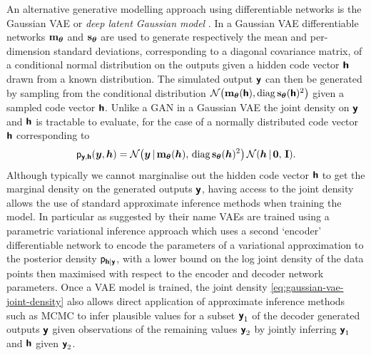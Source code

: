 
An alternative generative modelling approach using differentiable networks is the Gaussian \ac{VAE}  or \emph{deep latent Gaussian model} \citep{rezende2014stochastic}. In a Gaussian \ac{VAE} differentiable networks ${\mathbf{m}}_{\boldsymbol{\theta}}$ and ${\mathbf{s}}_{\boldsymbol{\theta}}$ are used to generate respectively the mean and per-dimension standard deviations, corresponding to a diagonal covariance matrix, of a conditional normal distribution on the outputs given a hidden code vector $\boldsymbol{\mathsf{h}}$ drawn from a known distribution. The simulated output $\boldsymbol{\mathsf{y}}$ can then be generated by sampling from the conditional distribution $\nrm{\vctfunc{m}_{\vct{\theta}}(\rvct{h}), \diag\vctfunc{s}_{\vct{\theta}}(\rvct{h})^2}$ given a sampled code vector $\boldsymbol{\mathsf{h}}$. Unlike a \ac{GAN} in a Gaussian \ac{VAE} the joint density on $\boldsymbol{\mathsf{y}}$ and $\boldsymbol{\mathsf{h}}$ is tractable to evaluate, for the case of a normally distributed code vector $\boldsymbol{\mathsf{h}}$ corresponding to
\begin{equation}\label{eq:gaussian-vae-joint-density}
  \pden{\rvct{y},\rvct{h}}(\vct{y},\vct{h}) = 
  \nrm{\vct{y} \gvn \vctfunc{m}_{\vct{\theta}}(\vct{h}),\, \diag\vctfunc{s}_{\vct{\theta}}(\vct{h})^2}\,
  \nrm{\vct{h} \gvn \vct{0},\,\idmtx}.
\end{equation}
Although typically we cannot marginalise out the hidden code vector $\boldsymbol{\mathsf{h}}$ to get the marginal density on the generated outputs $\boldsymbol{\mathsf{y}}$, having access to the joint density allows the use of standard approximate inference methods when training the model. In particular as suggested by their name \aclp{VAE} are trained using a parametric variational inference approach which uses a second `encoder' differentiable network to encode the parameters of a variational approximation to the posterior density $\mathsf{p}_{\boldsymbol{\mathsf{h}}|\boldsymbol{\mathsf{y}}}$, with a lower bound on the log joint density of the data points then maximised with respect to the encoder and decoder network parameters. Once a \ac{VAE} model is trained, the joint density \eqref{eq:gaussian-vae-joint-density} also allows direct application of approximate inference methods such as \acs{MCMC} to infer plausible values for a subset $\boldsymbol{\mathsf{y}}_1$ of the decoder generated outputs $\boldsymbol{\mathsf{y}}$ given observations of the remaining values $\boldsymbol{\mathsf{y}}_2$ by jointly inferring $\boldsymbol{\mathsf{y}}_1$ and $\boldsymbol{\mathsf{h}}$ given $\boldsymbol{\mathsf{y}}_2$.

